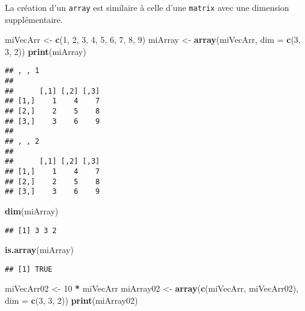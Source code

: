 \documentclass[]{book}
\newenvironment{Shaded}{\begin{snugshade}}{\end{snugshade}}
\newcommand{\KeywordTok}[1]{\textcolor[rgb]{0.13,0.29,0.53}{\textbf{#1}}}
\newcommand{\DataTypeTok}[1]{\textcolor[rgb]{0.13,0.29,0.53}{#1}}
\newcommand{\DecValTok}[1]{\textcolor[rgb]{0.00,0.00,0.81}{#1}}
\newcommand{\StringTok}[1]{\textcolor[rgb]{0.31,0.60,0.02}{#1}}
\newcommand{\OperatorTok}[1]{\textcolor[rgb]{0.81,0.36,0.00}{\textbf{#1}}}
\newcommand{\NormalTok}[1]{#1}
\theoremstyle{definition}
\theoremstyle{definition}
\theoremstyle{definition}
\theoremstyle{remark}
\begin{document}
La création d'un \texttt{array} est similaire à celle d'une
\texttt{matrix} avec une dimension supplémentaire.

\begin{Shaded}
\begin{Highlighting}[]
\NormalTok{miVecArr <-}\StringTok{ }\KeywordTok{c}\NormalTok{(}\DecValTok{1}\NormalTok{, }\DecValTok{2}\NormalTok{, }\DecValTok{3}\NormalTok{, }\DecValTok{4}\NormalTok{, }\DecValTok{5}\NormalTok{, }\DecValTok{6}\NormalTok{, }\DecValTok{7}\NormalTok{, }\DecValTok{8}\NormalTok{, }\DecValTok{9}\NormalTok{)}
\NormalTok{miArray <-}\StringTok{ }\KeywordTok{array}\NormalTok{(miVecArr, }\DataTypeTok{dim =} \KeywordTok{c}\NormalTok{(}\DecValTok{3}\NormalTok{, }\DecValTok{3}\NormalTok{, }\DecValTok{2}\NormalTok{))}
\KeywordTok{print}\NormalTok{(miArray)}
\end{Highlighting}
\end{Shaded}

\begin{verbatim}
## , , 1
## 
##      [,1] [,2] [,3]
## [1,]    1    4    7
## [2,]    2    5    8
## [3,]    3    6    9
## 
## , , 2
## 
##      [,1] [,2] [,3]
## [1,]    1    4    7
## [2,]    2    5    8
## [3,]    3    6    9
\end{verbatim}

\begin{Shaded}
\begin{Highlighting}[]
\KeywordTok{dim}\NormalTok{(miArray)}
\end{Highlighting}
\end{Shaded}

\begin{verbatim}
## [1] 3 3 2
\end{verbatim}

\begin{Shaded}
\begin{Highlighting}[]
\KeywordTok{is.array}\NormalTok{(miArray)}
\end{Highlighting}
\end{Shaded}

\begin{verbatim}
## [1] TRUE
\end{verbatim}

\begin{Shaded}
\begin{Highlighting}[]
\NormalTok{miVecArr02 <-}\StringTok{ }\DecValTok{10} \OperatorTok{*}\StringTok{ }\NormalTok{miVecArr}
\NormalTok{miArray02 <-}\StringTok{ }\KeywordTok{array}\NormalTok{(}\KeywordTok{c}\NormalTok{(miVecArr, miVecArr02), }\DataTypeTok{dim =} \KeywordTok{c}\NormalTok{(}\DecValTok{3}\NormalTok{, }\DecValTok{3}\NormalTok{, }\DecValTok{2}\NormalTok{))}
\KeywordTok{print}\NormalTok{(miArray02)}
\end{Highlighting}
\end{Shaded}
\end{document}
